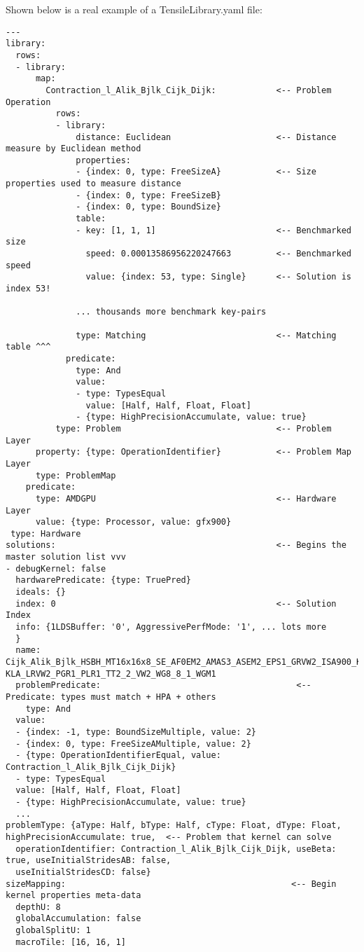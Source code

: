 \documentclass[]{article}
\begin{document}
Shown below is a real example of a TensileLibrary.yaml file:


\begin{verbatim}
---
library:
  rows:
  - library:
      map:
        Contraction_l_Alik_Bjlk_Cijk_Dijk:            <-- Problem Operation 
          rows:
          - library:
              distance: Euclidean                     <-- Distance measure by Euclidean method
              properties:
              - {index: 0, type: FreeSizeA}           <-- Size properties used to measure distance
              - {index: 0, type: FreeSizeB}    
              - {index: 0, type: BoundSize}
              table:
              - key: [1, 1, 1]                        <-- Benchmarked size
                speed: 0.00013586956220247663         <-- Benchmarked speed
                value: {index: 53, type: Single}      <-- Solution is index 53!

              ... thousands more benchmark key-pairs

              type: Matching                          <-- Matching table ^^^
            predicate: 
              type: And
              value:
              - type: TypesEqual                      
                value: [Half, Half, Float, Float]        
              - {type: HighPrecisionAccumulate, value: true}
          type: Problem                               <-- Problem Layer
      property: {type: OperationIdentifier}           <-- Problem Map Layer
      type: ProblemMap
    predicate:
      type: AMDGPU                                    <-- Hardware Layer
      value: {type: Processor, value: gfx900}
 type: Hardware
solutions:                                            <-- Begins the master solution list vvv
- debugKernel: false                                      
  hardwarePredicate: {type: TruePred}
  ideals: {}
  index: 0                                            <-- Solution Index
  info: {1LDSBuffer: '0', AggressivePerfMode: '1', ... lots more
  }
  name: Cijk_Alik_Bjlk_HSBH_MT16x16x8_SE_AF0EM2_AMAS3_ASEM2_EPS1_GRVW2_ISA900_K1_ KLA_LRVW2_PGR1_PLR1_TT2_2_VW2_WG8_8_1_WGM1
  problemPredicate:                                       <-- Predicate: types must match + HPA + others
    type: And
  value:
  - {index: -1, type: BoundSizeMultiple, value: 2}
  - {index: 0, type: FreeSizeAMultiple, value: 2}
  - {type: OperationIdentifierEqual, value: Contraction_l_Alik_Bjlk_Cijk_Dijk}
  - type: TypesEqual
  value: [Half, Half, Float, Float]
  - {type: HighPrecisionAccumulate, value: true}
  ...
problemType: {aType: Half, bType: Half, cType: Float, dType: Float, highPrecisionAccumulate: true,  <-- Problem that kernel can solve
  operationIdentifier: Contraction_l_Alik_Bjlk_Cijk_Dijk, useBeta: true, useInitialStridesAB: false,
  useInitialStridesCD: false}
sizeMapping:                                             <-- Begin kernel properties meta-data 
  depthU: 8
  globalAccumulation: false
  globalSplitU: 1
  macroTile: [16, 16, 1]


\end{verbatim}
\end{document}
